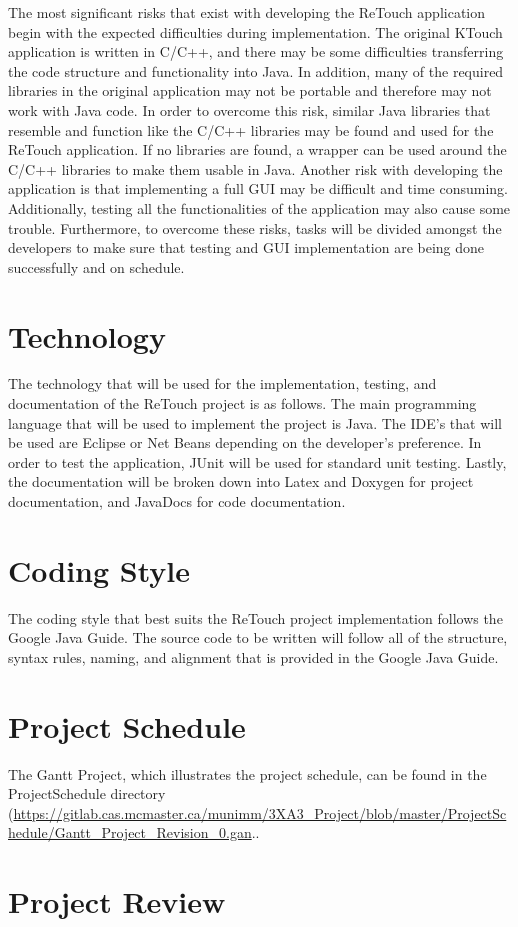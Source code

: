 \documentclass{article}
\begin{document}
    The most significant risks that exist with developing the ReTouch application begin with the expected difficulties during implementation. The original KTouch application is written in C/C++, and there may be some difficulties transferring the code structure and functionality into Java. In addition, many of the required libraries in the original application may not be portable and therefore may not work with Java code. In order to overcome this risk, similar Java libraries that resemble and function like the C/C++ libraries may be found and used for the ReTouch application. If no libraries are found, a wrapper can be used around the C/C++ libraries to make them usable in Java. Another risk with developing the application is that implementing a full GUI may be difficult and time consuming. Additionally, testing all the functionalities of the application may also cause some trouble. Furthermore, to overcome these risks, tasks will be divided amongst the developers to make sure that testing and GUI implementation are being done successfully and on schedule.


\section{Technology}

    The technology that will be used for the implementation, testing, and documentation of the ReTouch project is as follows. The main programming language that will be used to implement the project is Java. The IDE's that will be used are Eclipse or Net Beans depending on the developer's preference. In order to test the application, JUnit will be used for standard unit testing. Lastly, the documentation will be broken down into Latex and Doxygen for project documentation, and JavaDocs for code documentation.

\section{Coding Style}

    The coding style that best suits the ReTouch project implementation follows the Google Java Guide. The source code to be written will follow all of the structure, syntax rules, naming, and alignment that is provided in the Google Java Guide. 

\section{Project Schedule}

The Gantt Project, which illustrates the project schedule, can be found in the ProjectSchedule directory (\url{https://gitlab.cas.mcmaster.ca/munimm/3XA3_Project/blob/master/ProjectSchedule/Gantt_Project_Revision_0.gan}.. 


\section{Project Review}
\end{document}
